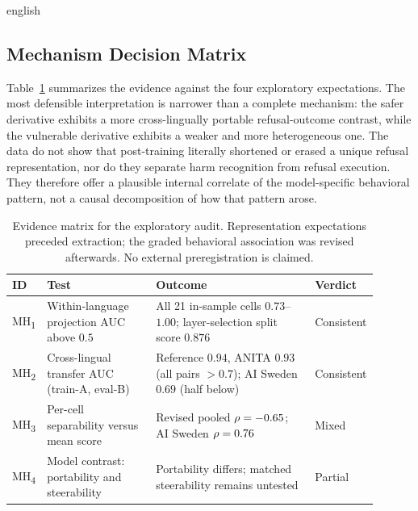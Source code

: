 \begin{otherlanguage*}{english}
\subsection{Mechanism Decision Matrix}
\label{sec:mechanism-decision-matrix}

Table~\ref{tab:mechanistic-decision-matrix} summarizes the evidence against the four exploratory expectations. The most defensible interpretation is narrower than a complete mechanism: the safer derivative exhibits a more cross-lingually portable refusal-outcome contrast, while the vulnerable derivative exhibits a weaker and more heterogeneous one. The data do not show that post-training literally shortened or erased a unique refusal representation, nor do they separate harm recognition from refusal execution. They therefore offer a plausible internal correlate of the model-specific behavioral pattern, not a causal decomposition of how that pattern arose.

\begin{table}[htbp]
\centering
\scriptsize
\caption[Evidence matrix for the refusal-direction audit]{Evidence matrix for the exploratory audit. Representation expectations preceded extraction; the graded behavioral association was revised afterwards. No external preregistration is claimed.}
\label{tab:mechanistic-decision-matrix}
\begin{tabular}{@{}p{0.06\linewidth}p{0.30\linewidth}p{0.44\linewidth}p{0.10\linewidth}@{}}
\toprule
ID & Test & Outcome & Verdict \\
\midrule
MH\textsubscript{1} & Within-language projection AUC above $0.5$ & All 21 in-sample cells $0.73$--$1.00$; layer-selection split score $0.876$ & Consistent \\
MH\textsubscript{2} & Cross-lingual transfer AUC (train-A, eval-B) & Reference $0.94$, ANITA $0.93$ (all pairs $>0.7$); AI Sweden $0.69$ (half below) & Consistent \\
MH\textsubscript{3} & Per-cell separability versus mean score & Revised pooled $\rho=-0.65{}$; AI Sweden $\rho=0.76{}$ & Mixed \\
MH\textsubscript{4} & Model contrast: portability and steerability & Portability differs; matched steerability remains untested & Partial \\
\bottomrule
\end{tabular}
\end{table}


\end{otherlanguage*}
